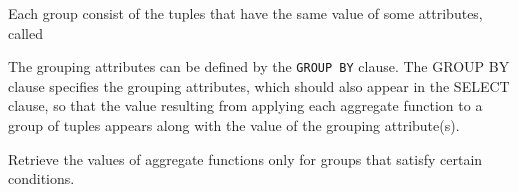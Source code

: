     \par Each group consist of the tuples that have the same value of some attributes, called 

    \par The grouping attributes can be defined by the \lstinline{GROUP BY} clause. The GROUP BY clause specifies the grouping attributes, which should also appear in the SELECT clause, so that the value resulting from applying each aggregate function to a group of tuples appears along with the value of the grouping attribute(s).

    \par Retrieve the values of aggregate functions only for groups that satisfy certain conditions.

